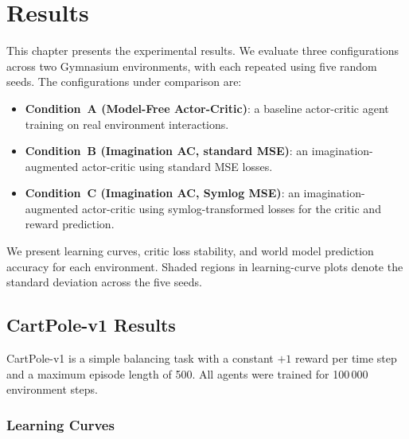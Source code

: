 
\chapter{Results}
\label{ch:results}

This chapter presents the experimental results. We evaluate three configurations across two Gymnasium environments, with each repeated using five random seeds. The configurations under comparison are:

\begin{itemize}
    \item \textbf{Condition~A (Model-Free Actor-Critic)}: a baseline actor-critic agent training on real environment interactions.
    \item \textbf{Condition~B (Imagination AC, standard MSE)}: an imagination-augmented actor-critic using standard MSE losses.
    \item \textbf{Condition~C (Imagination AC, Symlog MSE)}: an imagination-augmented actor-critic using symlog-transformed losses for the critic and reward prediction.
\end{itemize}

\noindent We present learning curves, critic loss stability, and world model prediction accuracy for each environment. Shaded regions in learning-curve plots denote the standard deviation across the five seeds.


\section{CartPole-v1 Results}
\label{sec:cartpole-results}

CartPole-v1 is a simple balancing task with a constant $+1$ reward per time
step and a maximum episode length of 500. All agents were trained for
100\,000 environment steps.

\subsection{Learning Curves}
\label{subsec:cartpole-learning}

